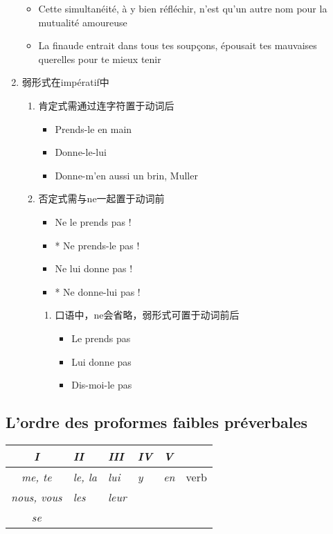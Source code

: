 \documentclass[UTF8]{report}
\begin{document}
\begin{enumerate}
    \begin{itemize}
        \item Cette simultanéité, à y bien réfléchir, n’est qu’un autre nom pour la mutualité amoureuse
        \item La finaude entrait dans tous tes soupçons, épousait tes mauvaises querelles pour te mieux tenir
    \end{itemize}
    \item 弱形式在impératif中
    \begin{enumerate}
        \item 肯定式需通过连字符置于动词后
        \begin{itemize}
            \item Prends-le en main
            \item Donne-le-lui
            \item Donne-m’en aussi un brin, Muller
        \end{itemize}
        \item 否定式需与ne一起置于动词前
        \begin{itemize}
            \item Ne le prends pas !
            \item * Ne prends-le pas !
            \item Ne lui donne pas !
            \item * Ne donne-lui pas !
        \end{itemize}
        \begin{enumerate}
            \item 口语中，ne会省略，弱形式可置于动词前后
            \begin{itemize}
                \item Le prends pas 
                \item Lui donne pas
                \item Dis-moi-le pas
            \end{itemize}
        \end{enumerate}
    \end{enumerate}
\end{enumerate}

\subsection{L’ordre des proformes faibles préverbales}
\begin{table}[H]
\centering
\renewcommand{\arraystretch}{1.5}
\begin{tabular}{|>{\itshape}c|>{\itshape}l|>{\itshape}l|>{\itshape}l|>{\itshape}l|l|}
\hline
\textbf{I} & \textbf{II} & \textbf{III} & \textbf{IV} & \textbf{V} &  \\
\hline
me, te & le, la & lui & y & en & verb \\
nous, vous & les & leur & & & \\
se & & & & & \\
\cline{1-5}
\hline
\end{tabular}
\end{table}
\end{document}
